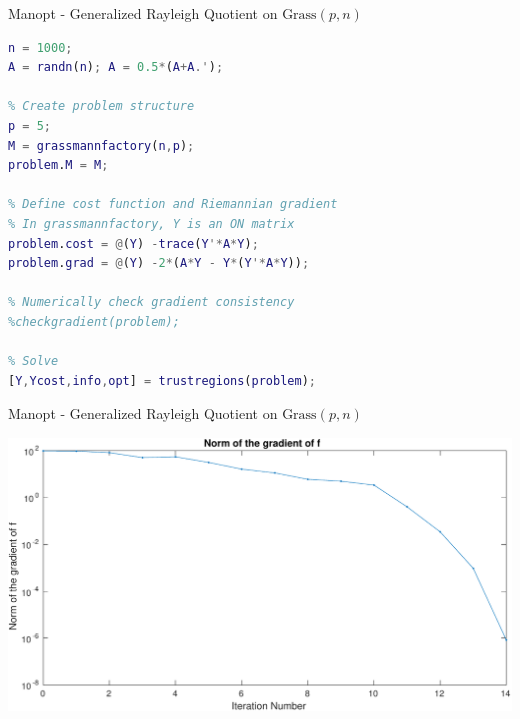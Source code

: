 \documentclass[xcolor=dvipsnames,t]{beamer} %
\begin{document}
\begin{frame}[fragile]{Manopt - Generalized Rayleigh Quotient on $\text{Grass}(p,n)$}
\begin{lstlisting}[language=Matlab,escapechar=!]
% Generate symmetric matrix
n = 1000;
A = randn(n); A = 0.5*(A+A.');

% Create problem structure
p = 5;
M = grassmannfactory(n,p);
problem.M = M;

% Define cost function and Riemannian gradient
% In grassmannfactory, Y is an ON matrix
problem.cost = @(Y) -trace(Y'*A*Y);
problem.grad = @(Y) -2*(A*Y - Y*(Y'*A*Y));

% Numerically check gradient consistency
%checkgradient(problem);

% Solve
[Y,Ycost,info,opt] = trustregions(problem);
\end{lstlisting}
\end{frame}

\begin{frame}[fragile]{Manopt - Generalized Rayleigh Quotient on $\text{Grass}(p,n)$}
   \begin{center}
      \includegraphics[width=\textwidth]{figures/rayleigh_grassmann_gradnorm.pdf}
   \end{center}
\end{frame}

\end{document}
